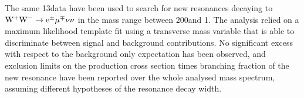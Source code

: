 The same 13\TeV data have been used to search for new resonances decaying to $\rm{W^+W^-}\to e^{\pm} \mu^{\mp}\nu\nu$ in the mass range between 200\GeV and 1\TeV. The analysis relied on a maximum likelihood template fit using a transverse mass variable that is able to discriminate between signal and background contributions. No significant excess with respect to the background only expectation has been observed, and exclusion limits on the production cross section times branching fraction of the new resonance have been reported over the whole analysed mass spectrum, assuming different hypotheses of the resonance decay width.
